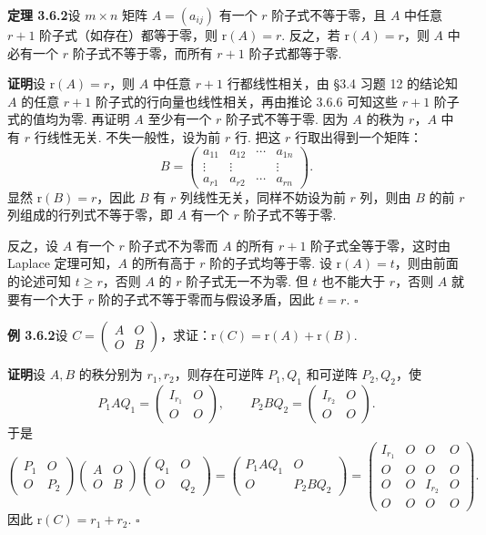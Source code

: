 \documentclass[UTF8, 12pt, fontset=fandol, oneside]{ctexart}
\begin{document}
\noindent\textbf{定理 3.6.2}\quad 设 $m\times n$ 矩阵 $A=(a_{ij})$ 有一个 $r$ 阶子式不等于零，且 $A$ 中任意 $r+1$ 阶子式（如存在）都等于零，则 $\mathrm{r}(A)=r$. 反之，若 $\mathrm{r}(A)=r$，则 $A$ 中必有一个 $r$ 阶子式不等于零，而所有 $r+1$ 阶子式都等于零.

\noindent\textbf{证明}\quad 设 $\mathrm{r}(A)=r$，则 $A$ 中任意 $r+1$ 行都线性相关，由 §3.4 习题 12 的结论知 $A$ 的任意 $r+1$ 阶子式的行向量也线性相关，再由推论 3.6.6 可知这些 $r+1$ 阶子式的值均为零. 再证明 $A$ 至少有一个 $r$ 阶子式不等于零. 因为 $A$ 的秩为 $r$，$A$ 中有 $r$ 行线性无关. 不失一般性，设为前 $r$ 行. 把这 $r$ 行取出得到一个矩阵：
\[
B=\left(\begin{array}{cccc}
a_{11}&a_{12}&\cdots&a_{1n}\\
\vdots&\vdots&&\vdots\\
a_{r1}&a_{r2}&\cdots&a_{rn}
\end{array}\right).
\]
显然 $\mathrm{r}(B)=r$，因此 $B$ 有 $r$ 列线性无关，同样不妨设为前 $r$ 列，则由 $B$ 的前 $r$ 列组成的行列式不等于零，即 $A$ 有一个 $r$ 阶子式不等于零.

反之，设 $A$ 有一个 $r$ 阶子式不为零而 $A$ 的所有 $r+1$ 阶子式全等于零，这时由 Laplace 定理可知，$A$ 的所有高于 $r$ 阶的子式均等于零. 设 $\mathrm{r}(A)=t$，则由前面的论述可知 $t\geq r$，否则 $A$ 的 $r$ 阶子式无一不为零. 但 $t$ 也不能大于 $r$，否则 $A$ 就要有一个大于 $r$ 阶的子式不等于零而与假设矛盾，因此 $t=r$. $\square$

\noindent\textbf{例 3.6.2}\quad 设 $C=\left(\begin{array}{cc}A&O\\O&B\end{array}\right)$，求证：$\mathrm{r}(C)=\mathrm{r}(A)+\mathrm{r}(B)$.

\noindent\textbf{证明}\quad 设 $A,B$ 的秩分别为 $r_1,r_2$，则存在可逆阵 $P_1,Q_1$ 和可逆阵 $P_2,Q_2$，使
\[
P_1AQ_1=\left(\begin{array}{cc}
I_{r_1}&O\\
O&O
\end{array}\right),\qquad
P_2BQ_2=\left(\begin{array}{cc}
I_{r_2}&O\\
O&O
\end{array}\right).
\]
于是
\[
\left(\begin{array}{cc}
P_1&O\\
O&P_2
\end{array}\right)
\left(\begin{array}{cc}
A&O\\
O&B
\end{array}\right)
\left(\begin{array}{cc}
Q_1&O\\
O&Q_2
\end{array}\right)
=
\left(\begin{array}{cc}
P_1AQ_1&O\\
O&P_2BQ_2
\end{array}\right)
=
\left(\begin{array}{cccc}
I_{r_1}&O&O&O\\
O&O&O&O\\
O&O&I_{r_2}&O\\
O&O&O&O
\end{array}\right).
\]
因此 $\mathrm{r}(C)=r_1+r_2$. $\square$
\end{document}
